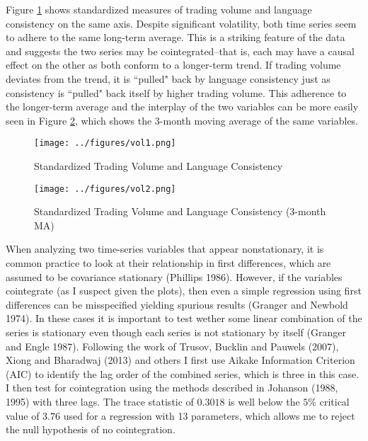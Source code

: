 Figure \ref{vol1} shows standardized measures of trading volume and language consistency on the same axis. Despite significant volatility, both time series seem to adhere to the same long-term average. This is a striking feature of the data and suggests the two series may be cointegrated--that is, each may have a causal effect on the other as both conform to a longer-term trend. If trading volume deviates from the trend, it is ``pulled" back by language consistency just as consistency is ``pulled" back itself by higher trading volume. This adherence to the longer-term average and the interplay of the two variables can be more easily seen in Figure \ref{vol2}, which shows the 3-month moving average of the same variables. 


\begin{figure}
\begin{center}
\texttt{[image: ../figures/vol1.png]}
\caption[Standardized Trading Volume and Language Consistency]{Standardized Trading Volume and Language Consistency\label{vol1}}
\end{center}
\end{figure}

\begin{figure}
\begin{center}
\texttt{[image: ../figures/vol2.png]}
\caption[Standardized Trading Volume and Language Consistency (3-month MA)]{Standardized Trading Volume and Language Consistency (3-month MA)\label{vol2}}
\end{center}
\end{figure}

When analyzing two time-series variables that appear nonstationary, it is common practice to look at their relationship in first differences, which are assumed to be covariance stationary (Phillips 1986). However, if the variables cointegrate (as I suspect given the plots), then even a simple regression using first differences can be misspecified yielding spurious results (Granger and Newbold 1974). In these cases it is important to test wether some linear combination of the series is stationary even though each series is not stationary by itself (Granger and Engle 1987). Following the work of Trusov, Bucklin and Pauwels (2007), Xiong and Bharadwaj (2013) and others I first use Aikake Information Criterion (AIC) to identify the lag order of the combined series, which is three in this case. I then test for cointegration using the methods described in Johanson (1988, 1995) with three lags. The trace statistic of $0.3018$ is well below the $5\%$ critical value of $3.76$ used for a regression with 13 parameters, which allows me to reject the null hypothesis of no cointegration.

